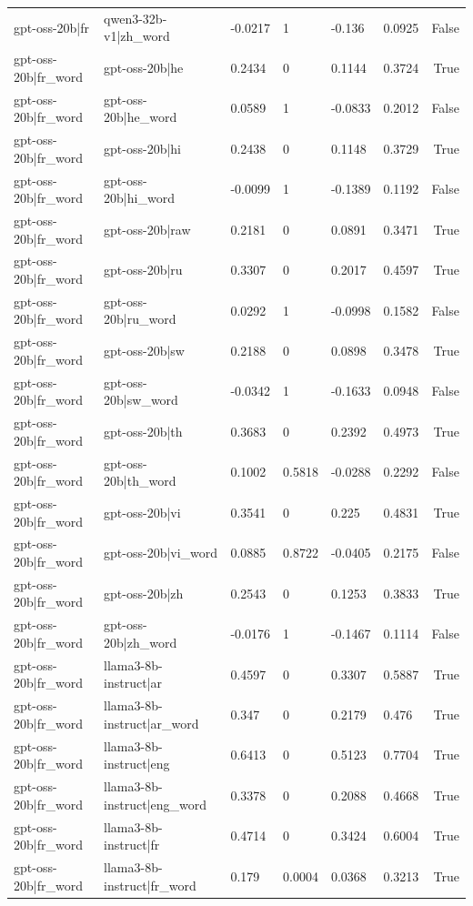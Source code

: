\begin{table}
\begin{tabular}{llllllr}
gpt-oss-20b|fr & qwen3-32b-v1|zh_word & -0.0217 & 1 & -0.136 & 0.0925 & False \\
gpt-oss-20b|fr_word & gpt-oss-20b|he & 0.2434 & 0 & 0.1144 & 0.3724 & True \\
gpt-oss-20b|fr_word & gpt-oss-20b|he_word & 0.0589 & 1 & -0.0833 & 0.2012 & False \\
gpt-oss-20b|fr_word & gpt-oss-20b|hi & 0.2438 & 0 & 0.1148 & 0.3729 & True \\
gpt-oss-20b|fr_word & gpt-oss-20b|hi_word & -0.0099 & 1 & -0.1389 & 0.1192 & False \\
gpt-oss-20b|fr_word & gpt-oss-20b|raw & 0.2181 & 0 & 0.0891 & 0.3471 & True \\
gpt-oss-20b|fr_word & gpt-oss-20b|ru & 0.3307 & 0 & 0.2017 & 0.4597 & True \\
gpt-oss-20b|fr_word & gpt-oss-20b|ru_word & 0.0292 & 1 & -0.0998 & 0.1582 & False \\
gpt-oss-20b|fr_word & gpt-oss-20b|sw & 0.2188 & 0 & 0.0898 & 0.3478 & True \\
gpt-oss-20b|fr_word & gpt-oss-20b|sw_word & -0.0342 & 1 & -0.1633 & 0.0948 & False \\
gpt-oss-20b|fr_word & gpt-oss-20b|th & 0.3683 & 0 & 0.2392 & 0.4973 & True \\
gpt-oss-20b|fr_word & gpt-oss-20b|th_word & 0.1002 & 0.5818 & -0.0288 & 0.2292 & False \\
gpt-oss-20b|fr_word & gpt-oss-20b|vi & 0.3541 & 0 & 0.225 & 0.4831 & True \\
gpt-oss-20b|fr_word & gpt-oss-20b|vi_word & 0.0885 & 0.8722 & -0.0405 & 0.2175 & False \\
gpt-oss-20b|fr_word & gpt-oss-20b|zh & 0.2543 & 0 & 0.1253 & 0.3833 & True \\
gpt-oss-20b|fr_word & gpt-oss-20b|zh_word & -0.0176 & 1 & -0.1467 & 0.1114 & False \\
gpt-oss-20b|fr_word & llama3-8b-instruct|ar & 0.4597 & 0 & 0.3307 & 0.5887 & True \\
gpt-oss-20b|fr_word & llama3-8b-instruct|ar_word & 0.347 & 0 & 0.2179 & 0.476 & True \\
gpt-oss-20b|fr_word & llama3-8b-instruct|eng & 0.6413 & 0 & 0.5123 & 0.7704 & True \\
gpt-oss-20b|fr_word & llama3-8b-instruct|eng_word & 0.3378 & 0 & 0.2088 & 0.4668 & True \\
gpt-oss-20b|fr_word & llama3-8b-instruct|fr & 0.4714 & 0 & 0.3424 & 0.6004 & True \\
gpt-oss-20b|fr_word & llama3-8b-instruct|fr_word & 0.179 & 0.0004 & 0.0368 & 0.3213 & True \\

\end{tabular}
\end{table}
